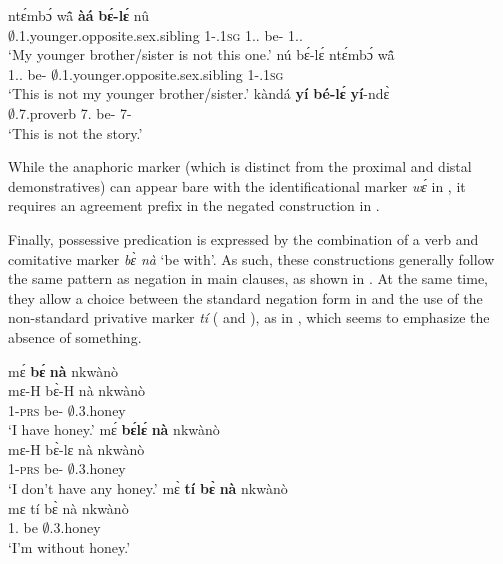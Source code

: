 \documentclass[output=paper,colorlinks=true, citecolor=brown,draftmode]{langscibook}
\begin{document}
\ea\label{we2}
\ea\label{we2a}
  \gll ntɛ́mbɔ́ wã̂ {\bfseries àá} {\bfseries bɛ́-lɛ́} nû \\
          $\emptyset$.1.younger.opposite.sex.sibling 1-{\POSS}.1\textsc{sg} 1.{\PRS}.{\NEG} be-{\NEG} 1.{\DEM}.{\PROX}  \\
    \trans `My younger brother/sister is not this one.'
\ex\label{we2b}
  \gll nú bɛ́-lɛ́ ntɛ́mbɔ́ wã̂\\
  1.{\DEM}.{\PRS} be-{\NEG} $\emptyset$.1.younger.opposite.sex.sibling 1-{\POSS}.1\textsc{sg}\\
      \trans `This is not my younger brother/sister.'
\ex\label{we2c}
  \gll kàndá {\bfseries yí} {\bfseries bé-lɛ́} {\bfseries yí}-ndɛ̀ \\
        $\emptyset$.7.proverb 7.{\PRS} be-{\NEG}  7-{\ANA}  \\
    \trans `This is not the story.'  
\z
\z

While the anaphoric marker (which is distinct from the proximal and distal demonstratives) can appear bare with the identificational marker {\itshape wɛ́} in , it requires an agreement prefix in the negated construction in . 

Finally, possessive predication is expressed by the combination of a verb and comitative marker {\itshape bɛ̀ nà}  `be with'.  As such, these constructions generally follow the same pattern as negation in main clauses, as shown in . At the same time, they allow a choice between the standard negation form in  and the use of the non-standard privative marker {\itshape tí}  ( and ), as in , which seems to emphasize the absence of something. 

\ea \label{honey}
\ea \label{honey1}
  \glll  mɛ́ {\bfseries bɛ́} {\bfseries nà} nkwànò  \\
        mɛ-H bɛ̀-H nà nkwànò \\
          1{\SG}-\textsc{prs} be-{\R} {\COM} $\emptyset$.3.honey\\
    \trans `I have honey.'
\ex \label{honey2}
  \glll  mɛ́ {\bfseries bɛ́lɛ́} {\bfseries nà} nkwànò  \\
        mɛ-H bɛ̀-lɛ nà nkwànò \\
          1{\SG}-\textsc{prs} be-{\NEG} {\COM} $\emptyset$.3.honey\\
    \trans `I don't have any honey.'
\ex \label{honey3}
  \glll  mɛ̀ {\bfseries tí} {\bfseries bɛ̀} {\bfseries nà} nkwànò  \\
        mɛ  tí bɛ̀ nà nkwànò \\
          1{\SG}.{\SBJ} {\NEG} be {\COM} $\emptyset$.3.honey\\
    \trans `I'm without honey.'    
\z
\z
\end{document}
